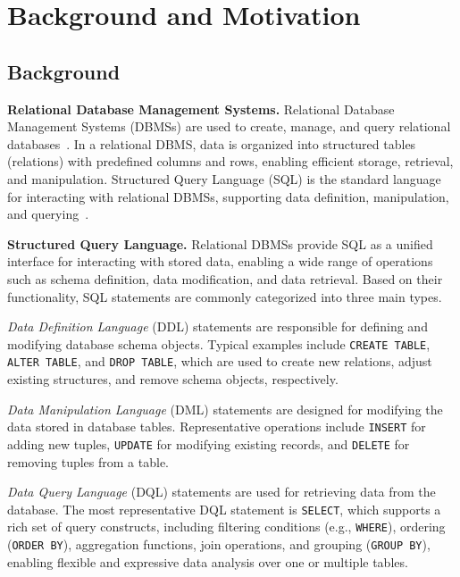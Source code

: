 \section{Background and Motivation}
\label{sec:background and motivation}

\subsection{Background}

\textbf{Relational Database Management Systems.}
Relational Database Management Systems (DBMSs) are used to create, manage, and query relational databases~\cite{wikipedia2024databases}.  
In a relational DBMS, data is organized into structured tables (relations) with predefined columns and rows, enabling efficient storage, retrieval, and manipulation. 
Structured Query Language (SQL) is the standard language for interacting with relational DBMSs, supporting data definition, manipulation, and querying~\cite{vanderlans1989sqlstandard}.

\textbf{Structured Query Language.}
Relational DBMSs provide SQL as a unified interface for interacting with stored data, enabling a wide range of operations such as schema definition, data modification, and data retrieval. 
Based on their functionality, SQL statements are commonly categorized into three main types.

\textit{Data Definition Language} (DDL) statements are responsible for defining and modifying database schema objects. 
Typical examples include \texttt{CREATE TABLE}, \texttt{ALTER TABLE}, and \texttt{DROP TABLE}, which are used to create new relations, adjust existing structures, and remove schema objects, respectively.

\textit{Data Manipulation Language} (DML) statements are designed for modifying the data stored in database tables. 
Representative operations include \texttt{INSERT} for adding new tuples, \texttt{UPDATE} for modifying existing records, and \texttt{DELETE} for removing tuples from a table.

\textit{Data Query Language} (DQL) statements are used for retrieving data from the database. 
The most representative DQL statement is \texttt{SELECT}, which supports a rich set of query constructs, including filtering conditions (e.g., \texttt{WHERE}), ordering (\texttt{ORDER BY}), aggregation functions, join operations, and grouping (\texttt{GROUP BY}), enabling flexible and expressive data analysis over one or multiple tables.


